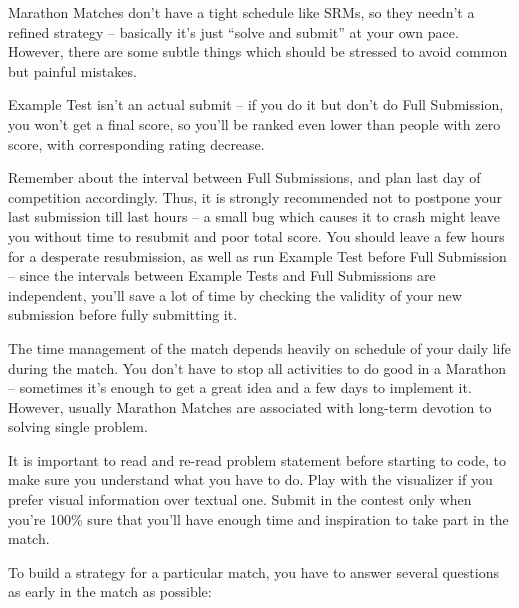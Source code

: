 \documentclass[]{article}
\begin{document}
Marathon Matches don't have a tight schedule like SRMs, so they needn't
a refined strategy -- basically it's just ``solve and submit'' at your
own pace. However, there are some subtle things which should be stressed
to avoid common but painful mistakes.

Example Test isn't an actual submit -- if you do it but don't do Full
Submission, you won't get a final score, so you'll be ranked even lower
than people with zero score, with corresponding rating decrease.

Remember about the interval between Full Submissions, and plan last day
of competition accordingly. Thus, it is strongly recommended not to
postpone your last submission till last hours -- a small bug which
causes it to crash might leave you without time to resubmit and poor
total score. You should leave a few hours for a desperate resubmission,
as well as run Example Test before Full Submission -- since the
intervals between Example Tests and Full Submissions are independent,
you'll save a lot of time by checking the validity of your new
submission before fully submitting it.

The time management of the match depends heavily on schedule of your
daily life during the match. You don't have to stop all activities to do
good in a Marathon -- sometimes it's enough to get a great idea and a
few days to implement it. However, usually Marathon Matches are
associated with long-term devotion to solving single problem.

It is important to read and re-read problem statement before starting to
code, to make sure you understand what you have to do. Play with the
visualizer if you prefer visual information over textual one. Submit in
the contest only when you're 100\% sure that you'll have enough time and
inspiration to take part in the match.

To build a strategy for a particular match, you have to answer several
questions as early in the match as possible:
\end{document}
